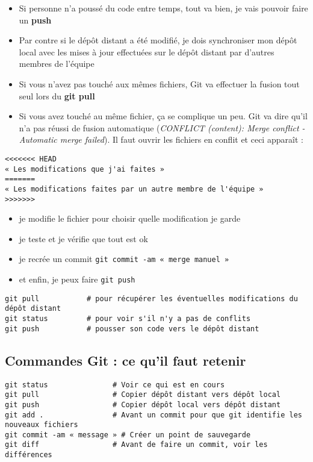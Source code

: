 \documentclass[11pt]{article}
\begin{document}
\begin{itemize}
    \item Si personne n'a poussé du code entre temps, tout va bien, je vais pouvoir faire un \textbf{push}
    \item Par contre si le dépôt distant a été modifié, je dois synchroniser mon dépôt local avec les mises à jour effectuées sur le dépôt distant par d'autres membres de l'équipe
    \item Si vous n'avez pas touché aux mêmes fichiers, Git va effectuer la fusion tout seul lors du \textbf{git pull}
    \item Si vous avez touché au même fichier, ça se complique un peu. Git va dire qu'il n'a pas réussi de fusion automatique (\textit{CONFLICT (content): Merge conflict - Automatic merge failed}). Il faut ouvrir les fichiers en conflit et ceci apparaît : 
\end{itemize}


\noindent
\verb"<<<<<<< HEAD" \\
\verb"« Les modifications que j'ai faites »" \\
\verb"=======" \\
\verb"« Les modifications faites par un autre membre de l'équipe »" \\
\verb">>>>>>>" \\

\begin{itemize}
    \item je modifie le fichier pour choisir quelle modification je garde
    \item je teste et je vérifie que tout est ok
    \item je recrée un commit \verb"git commit -am « merge manuel »"
    \item et enfin, je peux faire \verb"git push"
\end{itemize}

\noindent
\verb"git pull           # pour récupérer les éventuelles modifications du dépôt distant" \\
\verb"git status         # pour voir s'il n'y a pas de conflits" \\
\verb"git push           # pousser son code vers le dépôt distant" \\



\subsection*{Commandes Git : ce qu'il faut retenir}

\noindent
\verb"git status               # Voir ce qui est en cours" \\
\verb"git pull                 # Copier dépôt distant vers dépôt local" \\
\verb"git push                 # Copier dépôt local vers dépôt distant" \\
\verb"git add .                # Avant un commit pour que git identifie les nouveaux fichiers" \\
\verb"git commit -am « message » # Créer un point de sauvegarde" \\
\verb"git diff                 # Avant de faire un commit, voir les différences" \\
\end{document}
